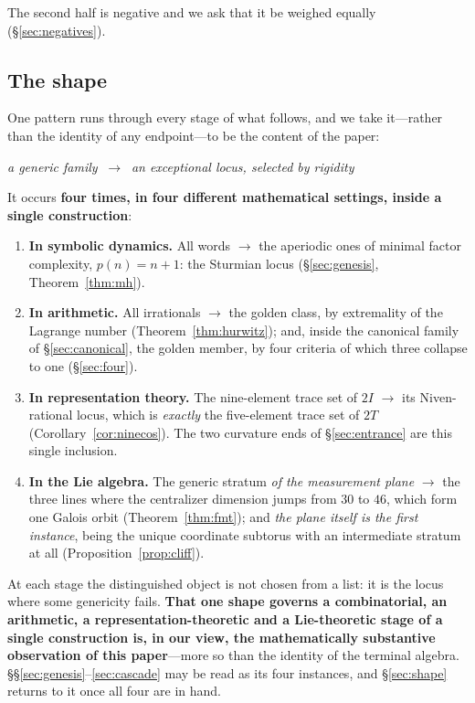 \documentclass[11pt,reqno]{amsart}
\theoremstyle{plain}
\theoremstyle{definition}
\theoremstyle{remark}
\begin{document}
The second half is negative and we ask that it be weighed equally
(\S\ref{sec:negatives}).

\subsection{The shape}\label{sec:shape2}
One pattern runs through every stage of what follows, and we take it---rather than the
identity of any endpoint---to be the content of the paper:
\begin{center}
\emph{a generic family} $\ \longrightarrow\ $ \emph{an exceptional locus, selected by
rigidity}
\end{center}
It occurs \textbf{four times, in four different mathematical settings, inside a single
construction}:
\begin{enumerate}[leftmargin=2.2em]
\item \textbf{In symbolic dynamics.} All words $\longrightarrow$ the aperiodic ones of
  minimal factor complexity, $p(n)=n+1$: the Sturmian locus
  (\S\ref{sec:genesis}, Theorem~\ref{thm:mh}).
\item \textbf{In arithmetic.} All irrationals $\longrightarrow$ the golden class, by
  extremality of the Lagrange number (Theorem~\ref{thm:hurwitz}); and, inside the
  canonical family of \S\ref{sec:canonical}, the golden member, by four criteria of
  which three collapse to one (\S\ref{sec:four}).
\item \textbf{In representation theory.} The nine-element trace set of $2I$
  $\longrightarrow$ its Niven-rational locus, which is \emph{exactly} the five-element
  trace set of $2T$ (Corollary~\ref{cor:ninecos}). The two curvature ends of
  \S\ref{sec:entrance} are this single inclusion.
\item \textbf{In the Lie algebra.} The generic stratum \emph{of the measurement plane}
  $\longrightarrow$ the three lines where the centralizer dimension jumps from $30$ to
  $46$, which form one Galois orbit (Theorem~\ref{thm:fmt}); and \emph{the plane itself
  is the first instance}, being the unique coordinate subtorus with an intermediate
  stratum at all (Proposition~\ref{prop:cliff}).
\end{enumerate}
At each stage the distinguished object is not chosen from a list: it is the locus where
some genericity fails. \textbf{That one shape governs a combinatorial, an arithmetic, a
representation-theoretic and a Lie-theoretic stage of a single construction is, in our
view, the mathematically substantive observation of this paper}---more so than the
identity of the terminal algebra. \S\S\ref{sec:genesis}--\ref{sec:cascade} may be read
as its four instances, and \S\ref{sec:shape} returns to it once all four are in hand.
\end{document}
